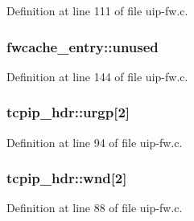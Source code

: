 Definition at line 111 of file uip-\/fw.c.

\hypertarget{group__uipfw_ga4b6ce01bb79734997584ce27060dd544}{
\subsubsection[{unused}]{ {\bf fwcache\_\-entry::unused}}}
\label{group__uipfw_ga4b6ce01bb79734997584ce27060dd544}


Definition at line 144 of file uip-\/fw.c.

\hypertarget{group__uipfw_gadee52ce29db507d7d12185a0e9388b51}{
\subsubsection[{urgp}]{ {\bf tcpip\_\-hdr::urgp}\mbox{[}2\mbox{]}}}
\label{group__uipfw_gadee52ce29db507d7d12185a0e9388b51}


Definition at line 94 of file uip-\/fw.c.

\hypertarget{group__uipfw_ga8da4793ac511e68c37ad2dcfd37c639b}{
\subsubsection[{wnd}]{ {\bf tcpip\_\-hdr::wnd}\mbox{[}2\mbox{]}}}
\label{group__uipfw_ga8da4793ac511e68c37ad2dcfd37c639b}


Definition at line 88 of file uip-\/fw.c.

